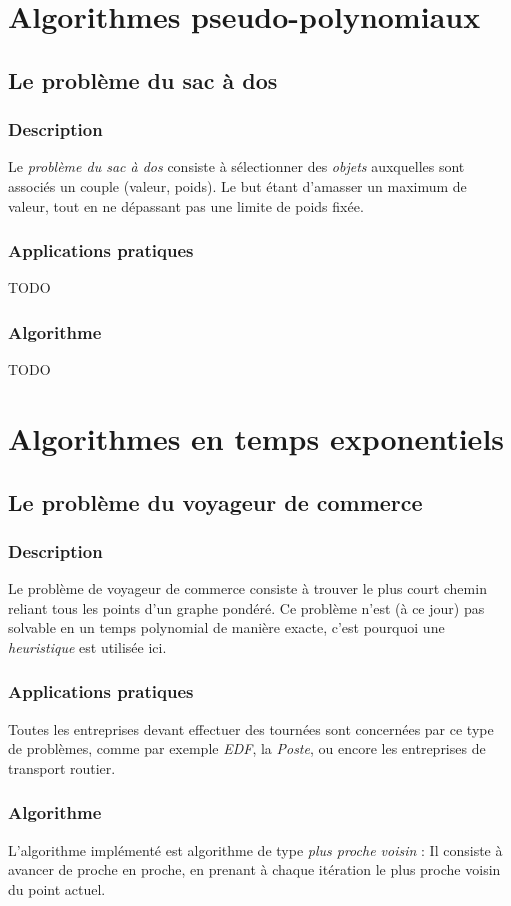 \section{Algorithmes pseudo-polynomiaux}
    \subsection{Le problème du sac à dos}
        \subsubsection{Description}
            Le \emph{problème du sac à dos} consiste à sélectionner
            des \emph{objets} auxquelles sont associés un couple (valeur, poids).
            Le but étant d'amasser un maximum de valeur, tout en ne dépassant
            pas une limite de poids fixée.
        \subsubsection{Applications pratiques}
            TODO
        \subsubsection{Algorithme}
            TODO



\section{Algorithmes en temps exponentiels}
     \subsection{Le problème du voyageur de commerce}
        \subsubsection{Description}
                Le problème de voyageur de commerce consiste à trouver le plus
                court chemin reliant tous les points d'un graphe pondéré.
                Ce problème n'est (à ce jour) pas solvable en un temps
                polynomial de manière exacte, c'est pourquoi une \emph{heuristique}
                est utilisée ici.
        \subsubsection{Applications pratiques}
            Toutes les entreprises devant effectuer des tournées sont concernées
            par ce type de problèmes, comme par exemple \emph{EDF},
            la \emph{Poste}, ou encore les entreprises de transport routier.
        \subsubsection{Algorithme}
            L'algorithme implémenté est algorithme de type \emph{plus proche voisin} :
            Il consiste à avancer
            de proche en proche, en prenant à chaque itération le plus
            proche voisin du point actuel.
